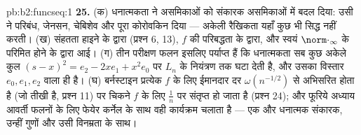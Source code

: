 \begin{solution}{pb:b2:funcseq:1}
\textbf{25.} (क) धनात्मकता ने  असमिकाओं को संकारक असमिकाओं में
बदल दिया: उसी ने  परिबंध, जेनसन, चेबिशेव और पूरा कोरोवकिन दिया ---
अकेली रैखिकता यहाँ कुछ भी सिद्ध नहीं करती। (ख) संहतता हाइने के द्वारा
(प्रश्न 6, 13), $f$ की परिबद्धता के द्वारा, और स्वयं  $\norm\cdot_\infty$ के
परिमित होने के द्वारा आई। (ग) तीन परीक्षण फलन इसलिए पर्याप्त हैं कि
धनात्मकता सब कुछ अकेले कुल $(s-x)^2 = e_2 - 2xe_1 + x^2e_0$ पर $L_n$ के नियंत्रण तक घटा देती है, और उसका
विस्तार $e_0, e_1, e_2$ वाला ही है। (घ) बर्नस्टाइन प्रत्येक  $f$ के लिए ईमानदार
दर $\omega(n^{-1/2})$ से अभिसरित होता है (जो तीखी है, प्रश्न 11) पर चिकने $f$ के लिए $\frac1n$
पर संतृप्त हो जाता है (प्रश्न 24); और फूरिये अध्याय आवर्ती फलनों के लिए
फेयेर कर्नेल के साथ वही कार्यक्रम चलाता है --- एक और धनात्मक संकारक, उन्हीं
गुणों और उसी विनम्रता के साथ।
\end{solution}
